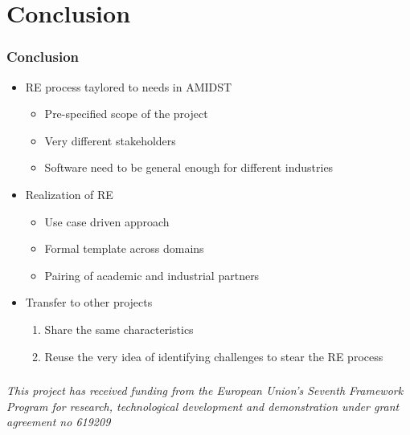\documentclass{beamer}
\begin{document}
\section{Conclusion}

\begin{frame} \frametitle{Conclusion} 
\vspace{-1cm}
\begin{itemize}
\item<1-> RE process taylored to needs in AMIDST
\begin{itemize}
\item<1-> Pre-specified scope of the project
\item<1-> Very different stakeholders
\item<1-> Software need to be general enough for different industries
\end{itemize}
\item<2-> Realization of RE 
\begin{itemize}
\item<2-> Use case driven approach
\item<2-> Formal template across domains
\item<2-> Pairing of academic and industrial partners
\end{itemize}
\item<3-> Transfer to other projects 
\begin{enumerate}
\item<4-> Share the same characteristics
\item<5-> Reuse the very idea of identifying challenges to stear the RE process
\end{enumerate}
\end{itemize}
\end{frame}

\begin{frame} \frametitle{} 
{\it This project has received funding from the European Union's Seventh Framework Program for research, technological development and demonstration under grant agreement no 619209}
\end{frame}
\end{document}

